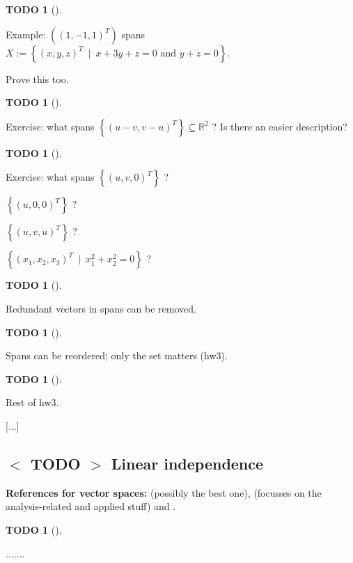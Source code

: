 \documentclass[numbers=enddot,12pt,final,onecolumn,notitlepage]{scrartcl}%
\theoremstyle{definition}
\newtheorem{quest}[theo]{TODO}
\newenvironment{todo}[1][]
{\begin{quest}[#1]\begin{leftbar}}
{\end{leftbar}\end{quest}}
\begin{document}
\begin{todo}
Example: $\left(  \left(  1,-1,1\right)  ^{T}\right)  $ spans $X:=\left\{
\left(  x,y,z\right)  ^{T}\ \mid\ x+3y+z=0\text{ and }y+z=0\right\}  $.

Prove this too.
\end{todo}



\begin{todo}
Exercise: what spans $\left\{  \left(  u-v,v-u\right)  ^{T}\right\}
\subseteq\mathbb{R}^{2}$ ? Is there an easier description?
\end{todo}



\begin{todo}
Exercise: what spans $\left\{  \left(  u,v,0\right)  ^{T}\right\}  $ ?

$\left\{  \left(  u,0,0\right)  ^{T}\right\}  $ ?

$\left\{  \left(  u,v,u\right)  ^{T}\right\}  $ ?

$\left\{  \left(  x_{1},x_{2},x_{3}\right)  ^{T}\ \mid\ x_{1}^{2}+x_{2}%
^{2}=0\right\}  $ ?
\end{todo}



\begin{todo}
Redundant vectors in spans can be removed.
\end{todo}



\begin{todo}
Spans can be reordered; only the set matters (hw3).
\end{todo}



\begin{todo}
Rest of hw3.
\end{todo}

[...]

\subsection{%
$<$%
TODO%
$>$
Linear independence}

\textbf{References for vector spaces:} \cite[\S 5.2]{LaNaSc16} (possibly the
best one), \cite[\S 2.3]{OlvSha06} (focusses on the analysis-related and
applied stuff) and \cite[Two.II]{Heffer16}.

\begin{todo}
.......
\end{todo}
\end{document}
